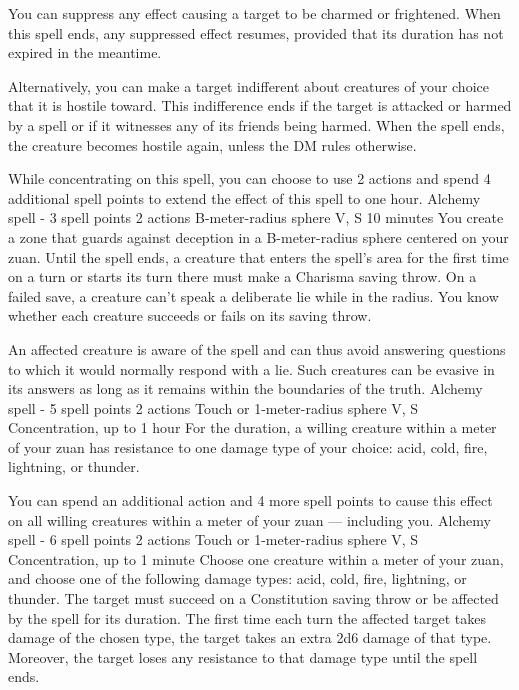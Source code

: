         You can suppress any effect causing a target to be charmed or frightened.
        When this spell ends, any suppressed effect resumes, provided that its duration has not expired in the meantime.

        Alternatively, you can make a target indifferent about creatures of your choice that it is hostile toward.
        This indifference ends if the target is attacked or harmed by a spell or if it witnesses any of its friends being harmed.
        When the spell ends, the creature becomes hostile again, unless the DM rules otherwise.

        While concentrating on this spell, you can choose to use 2 actions and spend 4 additional spell points to extend the effect of this spell to one hour.
        {Alchemy spell - 3 spell points}
        {2 actions}
        {B-meter-radius sphere}
        {V, S}
        {10 minutes}
        You create a zone that guards against deception in a B-meter-radius sphere centered on your zuan.
        Until the spell ends, a creature that enters the spell's area for the first time on a turn or starts its turn there must make a Charisma saving throw.
        On a failed save, a creature can't speak a deliberate lie while in the radius.
        You know whether each creature succeeds or fails on its saving throw.

        An affected creature is aware of the spell and can thus avoid answering questions to which it would normally respond with a lie.
        Such creatures can be evasive in its answers as long as it remains within the boundaries of the truth.
        {Alchemy spell - 5 spell points}
        {2 actions}
        {Touch or 1-meter-radius sphere}
        {V, S}
        {Concentration, up to 1 hour}
        For the duration, a willing creature within a meter of your zuan has resistance to one damage type of your choice: acid, cold, fire, lightning, or thunder.

        You can spend an additional action and 4 more spell points to cause this effect on all willing creatures within a meter of your zuan --- including you.
        {Alchemy spell - 6 spell points}
        {2 actions}
        {Touch or 1-meter-radius sphere}
        {V, S}
        {Concentration, up to 1 minute}
        Choose one creature within a meter of your zuan, and choose one of the following damage types: acid, cold, fire, lightning, or thunder.
        The target must succeed on a Constitution saving throw or be affected by the spell for its duration.
        The first time each turn the affected target takes damage of the chosen type, the target takes an extra 2d6 damage of that type.
        Moreover, the target loses any resistance to that damage type until the spell ends.

